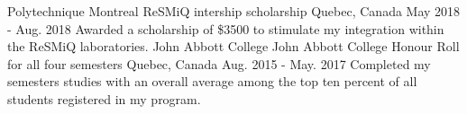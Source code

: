 \begin{cventries}
\cventry
    {Polytechnique Montreal}
    {ReSMiQ intership scholarship}
    {Quebec, Canada}
    {May 2018 - Aug. 2018}
    {
      {Awarded a scholarship of \$3500 to stimulate my integration within the  ReSMiQ laboratories.}  
    }
  \cventry
    {John Abbott College}
    {John Abbott College Honour Roll for all four semesters}
    {Quebec, Canada}
    {Aug. 2015 - May. 2017}
    {
      {Completed my semesters
studies with an overall average among the top
ten percent of all students registered in my
program.}  
    }
\end{cventries}